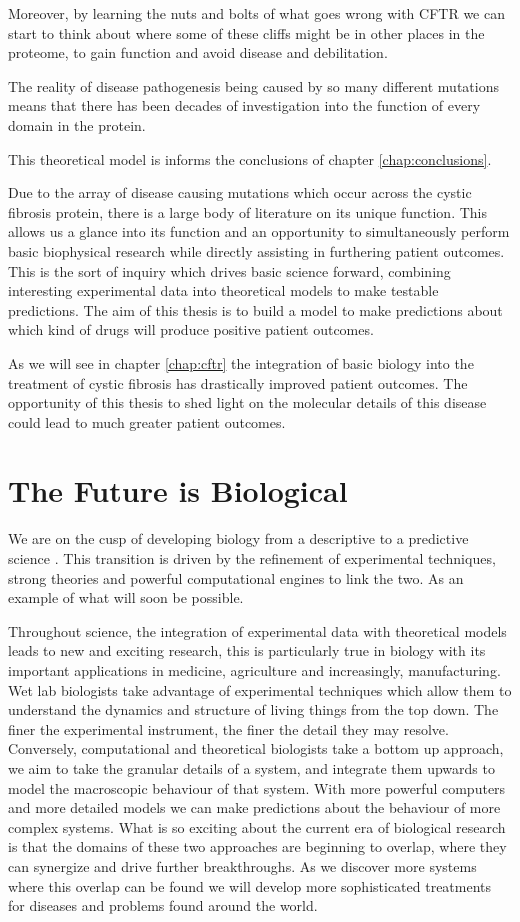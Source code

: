 Moreover, by learning the nuts and bolts of what goes wrong with CFTR we can start to think about where some of these cliffs might be in other places in the proteome, to gain function and avoid disease and debilitation.

The reality of disease pathogenesis being caused by so many different mutations means that there has been decades of investigation into the function of every domain in the protein. 

This theoretical model is informs the conclusions of chapter \ref{chap:conclusions}.

Due to the array of disease causing mutations which occur across the cystic fibrosis protein, there is a large body of literature on its unique function. This allows us a glance into its function and an opportunity to simultaneously perform basic biophysical research while directly assisting in furthering patient outcomes. This is the sort of inquiry which drives basic science forward, combining interesting experimental data into theoretical models to make testable predictions. The aim of this thesis is to build a model to make predictions about which kind of drugs will produce positive patient outcomes.

As we will see in chapter \ref{chap:cftr} the integration of basic biology into the treatment of cystic fibrosis has drastically improved patient outcomes. The opportunity of this thesis to shed light on the molecular details of this disease could lead to much greater patient outcomes. 

\section{The Future is Biological}
We are on the cusp of developing biology from a descriptive to a predictive science \cite{kochanski1973,liu2005, mogilner2016, covert2021, jumper2021}. This transition is driven by the refinement of experimental techniques, strong theories and powerful computational engines to link the two. As an example of what will soon be possible.

Throughout science, the integration of experimental data with theoretical models leads to new and exciting research, this is particularly true in biology with its important applications in medicine, agriculture and increasingly, manufacturing. Wet lab biologists take advantage of experimental techniques which allow them to understand the dynamics and structure of living things from the top down. The finer the experimental instrument, the finer the detail they may resolve. Conversely, computational and theoretical biologists take a bottom up approach, we aim to take the granular details of a system, and integrate them upwards to model the macroscopic behaviour of that system. With more powerful computers and more detailed models we can make predictions about the behaviour of more complex systems. What is so exciting about the current era of biological research is that the domains of these two approaches are beginning to overlap, where they can synergize  and drive further breakthroughs. As we discover more systems where this overlap can be found we will develop more sophisticated treatments for diseases and problems found around the world.

